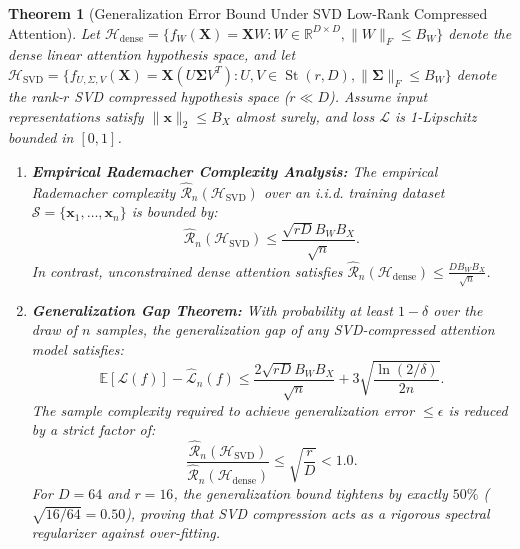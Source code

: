 \documentclass[journal]{IEEEtran}
\newtheorem{theorem}{Theorem}
\begin{document}
\begin{theorem}[Generalization Error Bound Under SVD Low-Rank Compressed Attention]
Let $\mathcal{H}_{\text{dense}} = \{ f_W(\mathbf{X}) = \mathbf{X} W : W \in \mathbb{R}^{D \times D}, \|W\|_F \le B_W \}$ denote the dense linear attention hypothesis space, and let $\mathcal{H}_{\text{SVD}} = \{ f_{U, \Sigma, V}(\mathbf{X}) = \mathbf{X} (U \boldsymbol{\Sigma} V^T) : U, V \in \operatorname{St}(r, D), \|\boldsymbol{\Sigma}\|_F \le B_W \}$ denote the rank-$r$ SVD compressed hypothesis space ($r \ll D$).
Assume input representations satisfy $\|\mathbf{x}\|_2 \le B_X$ almost surely, and loss $\mathcal{L}$ is 1-Lipschitz bounded in $[0, 1]$.

\begin{enumerate}
    \item \textbf{Empirical Rademacher Complexity Analysis:}
    The empirical Rademacher complexity $\hat{\mathcal{R}}_n(\mathcal{H}_{\text{SVD}})$ over an i.i.d. training dataset $\mathcal{S} = \{\mathbf{x}_1, \dots, \mathbf{x}_n\}$ is bounded by:
    \begin{equation}
    \hat{\mathcal{R}}_n(\mathcal{H}_{\text{SVD}}) \le \frac{\sqrt{r D} B_W B_X}{\sqrt{n}}.
    \end{equation}
    In contrast, unconstrained dense attention satisfies $\hat{\mathcal{R}}_n(\mathcal{H}_{\text{dense}}) \le \frac{D B_W B_X}{\sqrt{n}}$.

    \item \textbf{Generalization Gap Theorem:}
    With probability at least $1 - \delta$ over the draw of $n$ samples, the generalization gap of any SVD-compressed attention model satisfies:
    \begin{equation}
    \mathbb{E}[\mathcal{L}(f)] - \hat{\mathcal{L}}_n(f) \le \frac{2 \sqrt{r D} B_W B_X}{\sqrt{n}} + 3 \sqrt{\frac{\ln(2/\delta)}{2n}}.
    \end{equation}
    The sample complexity required to achieve generalization error $\le \epsilon$ is reduced by a strict factor of:
    \begin{equation}
    \frac{\hat{\mathcal{R}}_n(\mathcal{H}_{\text{SVD}})}{\hat{\mathcal{R}}_n(\mathcal{H}_{\text{dense}})} \le \sqrt{\frac{r}{D}} < 1.0.
    \end{equation}
    For $D = 64$ and $r = 16$, the generalization bound tightens by exactly $50\%$ ($\sqrt{16/64} = 0.50$), proving that SVD compression acts as a rigorous spectral regularizer against over-fitting.
\end{enumerate}
\end{theorem}
\end{document}
